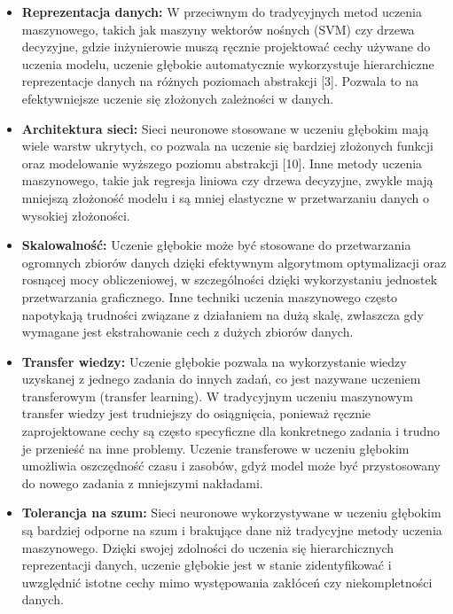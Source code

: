 \begin{itemize}
\item \textbf{Reprezentacja danych:} W przeciwnym do tradycyjnych metod uczenia maszynowego, takich jak maszyny wektorów nośnych (SVM) czy drzewa decyzyjne, gdzie inżynierowie muszą ręcznie projektować cechy używane do uczenia modelu, uczenie głębokie automatycznie wykorzystuje hierarchiczne reprezentacje danych na różnych poziomach abstrakcji [3]. Pozwala to na efektywniejsze uczenie się złożonych zależności w danych.

\item \textbf{Architektura sieci:} Sieci neuronowe stosowane w uczeniu głębokim mają wiele warstw ukrytych, co pozwala na uczenie się bardziej złożonych funkcji oraz modelowanie wyższego poziomu abstrakcji [10]. Inne metody uczenia maszynowego, takie jak regresja liniowa czy drzewa decyzyjne, zwykle mają mniejszą złożoność modelu i są mniej elastyczne w przetwarzaniu danych o wysokiej złożoności.

\item \textbf{Skalowalność:} Uczenie głębokie może być stosowane do przetwarzania ogromnych zbiorów danych dzięki efektywnym algorytmom optymalizacji oraz rosnącej mocy obliczeniowej, w szczególności dzięki wykorzystaniu jednostek przetwarzania graficznego. Inne techniki uczenia maszynowego często napotykają trudności związane z działaniem na dużą skalę, zwłaszcza gdy wymagane jest ekstrahowanie cech z dużych zbiorów danych.

\item \textbf{Transfer wiedzy:} Uczenie głębokie pozwala na wykorzystanie wiedzy uzyskanej z jednego zadania do innych zadań, co jest nazywane uczeniem transferowym (transfer learning). W tradycyjnym uczeniu maszynowym transfer wiedzy jest trudniejszy do osiągnięcia, ponieważ ręcznie zaprojektowane cechy są często specyficzne dla konkretnego zadania i trudno je przenieść na inne problemy. Uczenie transferowe w uczeniu głębokim umożliwia oszczędność czasu i zasobów, gdyż model może być przystosowany do nowego zadania z mniejszymi nakładami.

\item \textbf{Tolerancja na szum:} Sieci neuronowe wykorzystywane w uczeniu głębokim są bardziej odporne na szum i brakujące dane niż tradycyjne metody uczenia maszynowego. Dzięki swojej zdolności do uczenia się hierarchicznych reprezentacji danych, uczenie głębokie jest w stanie zidentyfikować i uwzględnić istotne cechy mimo występowania zakłóceń czy niekompletności danych.


\end{itemize}
